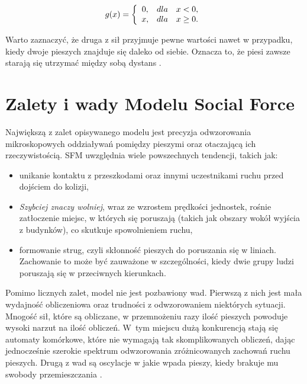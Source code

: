 \begin{equation}
g(x) = \left\{ 
\begin{array}{c l}	
     0, & dla \hspace{1em} x < 0,\\
     x, & dla \hspace{1em} x \geq 0.
\end{array}\right.
\end{equation}

Warto zaznaczyć, że druga z sił przyjmuje pewne wartości nawet w przypadku, kiedy dwoje pieszych znajduje się daleko od siebie. Oznacza to, że piesi zawsze starają się utrzymać między sobą dystans \cite{relativeVelocity}.


\section{Zalety i wady Modelu Social Force}

Największą z zalet opisywanego modelu jest precyzja odwzorowania mikroskopowych oddziaływań pomiędzy pieszymi oraz otaczającą ich rzeczywistością. SFM uwzględnia wiele powszechnych tendencji, takich jak:

\begin{itemize}
\item unikanie kontaktu z przeszkodami oraz innymi uczestnikami ruchu przed dojściem do kolizji,
\item \textit{Szybciej znaczy wolniej}, wraz ze wzrostem prędkości jednostek, rośnie zatłoczenie miejsc, w których się poruszają (takich jak obszary wokół wyjścia z budynków), co skutkuje spowolnieniem ruchu,
\item formowanie strug, czyli skłonność pieszych do poruszania się w liniach. Zachowanie to może być zauważone w szczególności, kiedy dwie grupy ludzi poruszają się w przeciwnych kierunkach.
\end{itemize}
Pomimo licznych zalet, model nie jest pozbawiony wad. Pierwszą z nich jest mała wydajność obliczeniowa oraz trudności z odwzorowaniem niektórych sytuacji. Mnogość sił, które są obliczane, w przemnożeniu razy ilość pieszych powoduje wysoki narzut na ilość obliczeń. W~tym miejscu dużą konkurencją stają się automaty komórkowe, które nie wymagają tak skomplikowanych obliczeń, dając jednocześnie szerokie spektrum odwzorowania zróżnicowanych zachowań ruchu pieszych. Drugą z wad są oscylacje w jakie wpada pieszy, kiedy brakuje mu swobody przemieszczania \cite{oscillations}.
